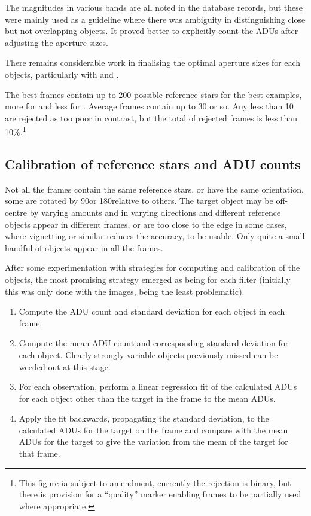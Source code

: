 The magnitudes in various bands are all noted in the database records, but these
were mainly used as a guideline where there was ambiguity in distinguishing
close but not overlapping objects. It proved better to explicitly count the ADUs
after adjusting the aperture sizes.

There remains considerable work in finalising the optimal aperture sizes for
each objects, particularly with {\prox} and {\bstar}.

The best frames contain up to 200 possible reference stars for the best
examples, more for {\prox} and less for {\bstar}. Average frames contain up to
30 or so. Any less than 10 are rejected as too poor in contrast, but the total of rejected frames is less than
10\%.\footnote{This figure ia subject to amendment, currently the rejection is
binary, but there is provision for a ``quality'' marker enabling frames to be
partially used where appropriate.}

\subsection{Calibration of reference stars and ADU counts}
\protect\label{section:calibrationrefstars}

Not all the frames contain the same reference stars, or have the same
orientation, some are rotated by 90\degree or 180\degree relative to others. The
target object may be off-centre by varying amounts and in varying directions and
different reference objects appear in different frames, or are too close to the
edge in some cases, where vignetting or similar reduces the accuracy, to be
usable. Only quite a small handful of objects appear in all the frames.

After some experimentation with strategies for computing and calibration of the
objects, the most promising strategy emerged as being for each filter
(initially this was only done with the {\rfilter} images, being the least
problematic).

\begin{enumerate}
  \item Compute the ADU count and standard deviation for each object in each
  frame.
  \item Compute the mean ADU count and corresponding standard
  deviation for each object. Clearly strongly variable objects previously missed can be weeded out
  at this stage.
  \item For each observation, perform a linear regression fit of the calculated
  ADUs for each object other than the target in the frame to the mean ADUs.
  \item Apply the fit backwards, propagating the standard deviation, to the
  calculated ADUs for the target on the frame and compare with the mean ADUs for
  the target to give the variation from the mean of the target for that frame.
\end{enumerate}

